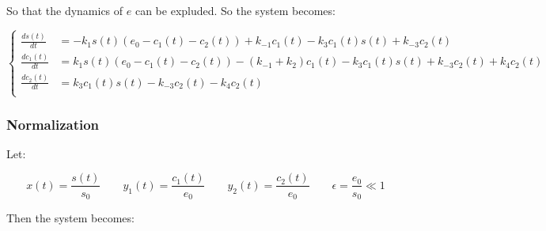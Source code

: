  So that the dynamics of $e$ can be expluded.
  So the system becomes:

  $$\begin{cases}
    \frac{ds(t)}{dt} &= -k_1s(t)(e_0-c_1(t)-c_2(t)) + k_{-1}c_1(t) -k_3c_1(t)s(t) + k_{-3}c_2(t)\\
    \frac{dc_1(t)}{dt} &= k_1s(t)(e_0-c_1(t)-c_2(t)) - (k_{-1}+k_2)c_1(t) - k_3c_1(t)s(t) + k_{-3}c_2(t) + k_4c_2(t)\\
    \frac{dc_2(t)}{dt} &= k_3c_1(t)s(t)-k_{-3}c_2(t)-k_4c_2(t)\\
  \end{cases}$$

    \subsubsection{Normalization}
    Let:

    $$x(t) = \frac{s(t)}{s_0}\qquad y_1(t) = \frac{c_1(t)}{e_0}\qquad y_2(t) = \frac{c_2(t)}{e_0}\qquad\epsilon = \frac{e_0}{s_0}\ll 1$$

    Then the system becomes:

